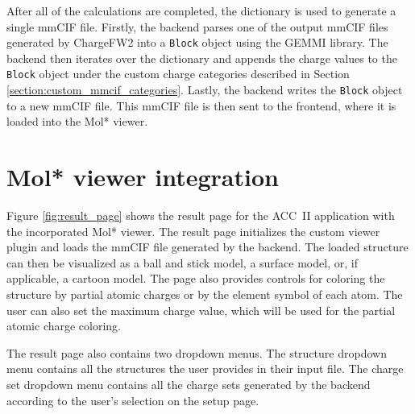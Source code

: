 \documentclass[
  digital,     %
  oneside,     %
  nosansbold,  %
  nocolorbold, %
  lof,         %
  lot,         %
]{fithesis4}
\begin{document}
After all of the calculations are completed, the dictionary is used to generate a single mmCIF file. Firstly, the backend parses one of the output mmCIF files generated by ChargeFW2 into a \texttt{Block} object using the GEMMI library. The backend then iterates over the dictionary and appends the charge values to the \texttt{Block} object under the custom charge categories described in Section \ref{section:custom_mmcif_categories}. Lastly, the backend writes the \texttt{Block} object to a new mmCIF file. This mmCIF file is then sent to the frontend, where it is loaded into the Mol* viewer.

\section{Mol* viewer integration}
\label{section:viewer_integration}

Figure \ref{fig:result_page} shows the result page for the ACC~II application with the incorporated Mol* viewer. The result page initializes the custom viewer plugin and loads the mmCIF file generated by the backend. The loaded structure can then be visualized as a ball and stick model, a surface model, or, if applicable, a cartoon model. The page also provides controls for coloring the structure by partial atomic charges or by the element symbol of each atom. The user can also set the maximum charge value, which will be used for the partial atomic charge coloring.

The result page also contains two dropdown menus. The structure dropdown menu contains all the structures the user provides in their input file. The charge set dropdown menu contains all the charge sets generated by the backend according to the user's selection on the setup page.
\end{document}
